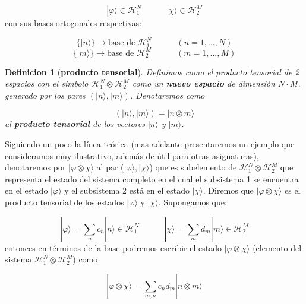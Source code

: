 \documentclass[12pt]{book}
\numberwithin{equation}{chapter}
\numberwithin{figure}{chapter}
\newcommand{\tquad}{\quad \quad \quad}
\newcommand{\Hcal}{\mathcal{H}}
\newtheorem{definition}{Definicion}[section]
\begin{document}
\begin{equation}
| \varphi \rangle \in \mathcal{H}_1^N \tquad | \chi \rangle \in \mathcal{H}_2^M
\end{equation}
con sus bases ortogonales respectivas:

\begin{equation}
\{ | n \rangle  \} \rightarrow \text{base de } \mathcal{H}_1^N \tquad (n=1,...,N) 
\end{equation}
\begin{equation}
\{ | m \rangle  \} \rightarrow \text{base de } \mathcal{H}_2^M \tquad (m=1,...,M) 
\end{equation} 

\begin{definition}[\textbf{producto tensorial}] Definimos como el producto tensorial de 2 espacios con el símbolo $\Hcal_1^N  \otimes \Hcal_2^M$ como un \textbf{ nuevo espacio} de dimensión $N\cdot M$, generado por los pares $(|n\rangle,|m\rangle)$. Denotaremos como

\begin{equation}
(|n\rangle,|m\rangle) = |n\otimes m\rangle
\end{equation}
al \textbf{producto tensorial} de los vectores $|n\rangle$ y $|m\rangle$.  \\
\end{definition}

Siguiendo un poco la línea teórica (mas adelante presentaremos un ejemplo que consideramos muy ilustrativo, además de útil para otras asignaturas), denotaremos por $|\varphi \otimes \chi \rangle$ al par ($|\varphi\rangle,|\chi\rangle$) que es subelemento de $\Hcal_1^N \otimes \Hcal_2^M$ que representa el estado del sistema completo en el cual el subsistema 1 se encuentra en el estado $|\varphi\rangle$ y el subsistema 2 está en el estado $|\chi\rangle$. Diremos que $|\varphi \otimes \chi \rangle$ es el producto tensorial de los estados $|\varphi \rangle$ y $|\chi \rangle$. Supongamos que: 

\begin{equation}
|\varphi \rangle = \sum_n c_n |n\rangle \in \Hcal_1^N \tquad | \chi \rangle = \sum_m d_m |m \rangle \in \Hcal_2^M
\end{equation}
entonces en términos de la base podremos escribir el estado $|\varphi \otimes \chi \rangle$ (elemento del sistema $\Hcal_1^N \otimes \Hcal_2^M$) como

\begin{equation}
|\varphi \otimes \chi \rangle = \sum_{m,n} c_n d_m |n \otimes m\rangle
\end{equation}
\end{document}
